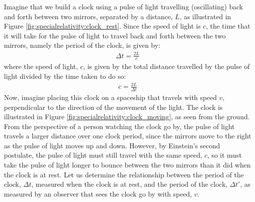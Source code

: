 Imagine that we build a clock using a pulse of light travelling (oscillating) back and forth between two mirrors, separated by a distance, $L$, as illustrated in Figure \ref{fig:specialrelativity:clock_rest}.
Since the speed of light is $c$, the time that it will take for the pulse of light to travel back and forth between the two mirrors, namely the period of the clock, is given by:
\begin{align*}
\Delta t = \frac{2L}{c}
\end{align*}
where the speed of light, $c$, is given by the total distance travelled by the pulse of light divided by the time taken to do so:
\begin{align*}
c=\frac{2L}{\Delta t}
\end{align*}
Now, imagine placing this clock on a spaceship that travels with speed $v$, perpendicular to the direction of the movement of the light. The clock is illustrated in Figure \ref{fig:specialrelativity:clock_moving}, as seen from the ground.
From the perspective of a person watching the clock go by, the pulse of light travels a larger distance over one clock period, since the mirrors move to the right as the pulse of light moves up and down. However, by Einstein's second postulate, the pulse of light must still travel with the same speed, $c$, so it must take the pulse of light longer to bounce between the two mirrors than it did when the clock is at rest. Let us determine the relationship between the period of the clock, $\Delta t$, measured when the clock is at rest, and the period of the clock, $\Delta t'$, as measured by an observer that sees the clock go by with speed, $v$. 

